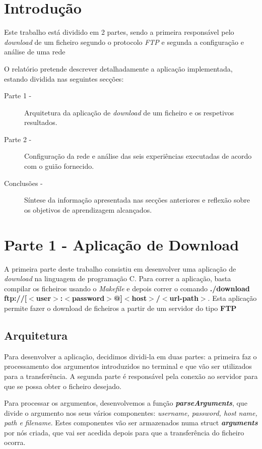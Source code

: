 \documentclass[11pt]{article}
\begin{document}
\section{Introdução}
Este trabalho está dividido em 2 partes, sendo a primeira responsável pelo \emph{download} de um ficheiro segundo o protocolo \emph{FTP} e segunda a configuração e análise de uma rede

O relatório pretende descrever detalhadamente a aplicação implementada, estando dividida nas seguintes secções:
\begin{description}
	\item[Parte 1 -] Arquitetura da aplicação de \emph{download} de um ficheiro e os respetivos resultados.
	\item[Parte 2 -] Configuração da rede e análise das seis experiências executadas de acordo com o guião fornecido.
	\item[Conclusões - ] Síntese da informação apresentada nas secções anteriores e reflexão sobre os objetivos de aprendizagem alcançados.
\end{description}


\section{Parte 1 - Aplicação de Download}
A primeira parte deste trabalho consistiu em desenvolver uma aplicação de \emph{download} na linguagem de programação C. Para correr a aplicação, basta compilar os ficheiros usando o \emph{Makefile} e depois correr o comando \textbf{./download ftp://[$<$user$>$:$<$password$>$@]$<$host$>$/$<$url-path$>$}. Esta aplicação permite fazer o download de ficheiros a partir de um servidor do tipo \textbf{FTP}

\subsection{Arquitetura}
Para desenvolver a aplicação, decidimos dividi-la em duas partes: a primeira faz o processamento dos argumentos introduzidos no terminal e que vão ser utilizados para a transferência. A segunda parte é responsável pela conexão ao servidor para que se possa obter o ficheiro desejado.

Para processar os argumentos, desenvolvemos a função \textit{\textbf{parseArguments}}, que divide o argumento nos seus vários componentes: \emph{username, password, host name, path e filename}. Estes componentes vão ser armazenados numa struct \textit{\textbf{arguments}} por nós criada, que vai ser acedida depois para que a transferência do ficheiro ocorra.
\end{document}
